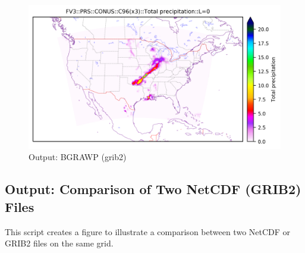 \documentclass[11pt,fleqn]{report}              %
\begin{document}
\begin{enumerate}
\begin{figure}[ht!]
  \centering
  \includegraphics[width=0.8\linewidth]{fv3_out_prs_CONUS_C96_tp_surface_L001.png}
  \caption{Output: BGRAWP (grib2)}
  \label{fig:py_out_prs}
\end{figure}

\end{enumerate}




\subsection{Output: Comparison of Two NetCDF (GRIB2) Files}

This script creates a figure to illustrate a comparison between two NetCDF or GRIB2 files on the same grid.
\end{document}
